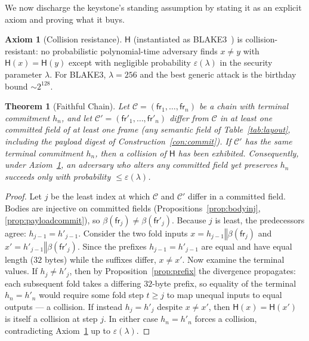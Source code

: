 \documentclass[11pt,oneside]{book}
\theoremstyle{definition}
\newtheorem{axiom}{Axiom}[chapter]
\theoremstyle{plain}
\newtheorem{theorem}{Theorem}[chapter]
\theoremstyle{remark}
\newcommand{\chainH}{\mathsf{H}}               %
\newcommand{\fr}{\mathsf{fr}}                   %
\newcommand{\body}{\beta}                       %
\newcommand{\concat}{\mathbin{\Vert}}           %
\newcommand{\Ledger}{\mathcal{C}}               %
\begin{document}
We now discharge the keystone's standing assumption by stating it as an explicit axiom and
proving what it buys.

\begin{axiom}[Collision resistance]\label{ax:cr}
$\chainH$ (instantiated as BLAKE3~\cite{blake3}) is collision-resistant: no probabilistic
polynomial-time adversary finds $x\ne y$ with $\chainH(x)=\chainH(y)$ except with negligible
probability $\varepsilon(\lambda)$ in the security parameter $\lambda$. For BLAKE3,
$\lambda=256$ and the best generic attack is the birthday bound $\sim 2^{128}$.
\end{axiom}

\begin{theorem}[Faithful Chain]\label{thm:faithful}
Let $\Ledger=(\fr_1,\dots,\fr_n)$ be a chain with terminal commitment $h_n$, and let
$\Ledger'=(\fr'_1,\dots,\fr'_n)$ differ from $\Ledger$ in at least one committed field of at
least one frame (any semantic field of Table~\ref{tab:layout}, including the payload digest of
Construction~\ref{con:commit}). If $\Ledger'$ has the \emph{same} terminal commitment $h_n$,
then a collision of $\chainH$ has been exhibited. Consequently, under Axiom~\ref{ax:cr}, an
adversary who alters any committed field yet preserves $h_n$ succeeds only with probability
$\le \varepsilon(\lambda)$.
\end{theorem}

\begin{proof}
Let $j$ be the least index at which $\Ledger$ and $\Ledger'$ differ in a committed field.
Bodies are injective on committed fields (Propositions~\ref{prop:bodyinj},
\ref{prop:payloadcommit}), so $\body(\fr_j)\ne\body(\fr'_j)$. Because $j$ is least, the
predecessors agree: $h_{j-1}=h'_{j-1}$. Consider the two fold inputs
$x=h_{j-1}\concat\body(\fr_j)$ and $x'=h'_{j-1}\concat\body(\fr'_j)$. Since the prefixes
$h_{j-1}=h'_{j-1}$ are equal and have equal length ($32$ bytes) while the suffixes differ,
$x\ne x'$. Now examine the terminal values. If $h_j\ne h'_j$, then by
Proposition~\ref{prop:prefix} the divergence propagates: each subsequent fold takes a differing
$32$-byte prefix, so equality of the terminal $h_n=h'_n$ would require some fold step
$t\ge j$ to map unequal inputs to equal outputs --- a collision. If instead $h_j=h'_j$ despite
$x\ne x'$, then $\chainH(x)=\chainH(x')$ is itself a collision at step $j$. In either case
$h_n=h'_n$ forces a collision, contradicting Axiom~\ref{ax:cr} up to $\varepsilon(\lambda)$.
\end{proof}
\end{document}
